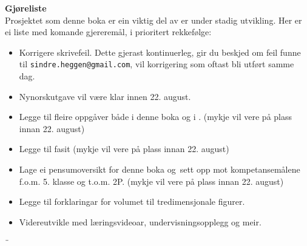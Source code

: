 \newpage
\textbf{Gjøreliste} \\
Prosjektet som denne boka er ein viktig del av er under stadig utvikling. Her er ei liste med komande gjereremål, i prioritert rekkefølge:
\begin{itemize}
	\item Korrigere skrivefeil. Dette gjerast kontinuerleg, gir du beskjed om feil funne til {\tt sindre.heggen@gmail.com}, vil korrigering som oftast bli utført samme dag.
	\item Nynorskutgave vil være klar innen 22. august.
	\item Legge til fleire oppgåver både i denne boka og i \mb. (mykje vil vere på plass innan 22. august)
	\item Legge til fasit (mykje vil vere på plass innan 22. august)
	\item Lage ei pensumoversikt for denne boka og \mb\,sett opp mot kompetansemålene f.o.m. 5. klasse og t.o.m. 2P. (mykje vil vere på plass innan 22. august)
	\item Legge til forklaringar for volumet til tredimensjonale figurer.
	\item Videreutvikle  med læringsvideoar, undervisningsopplegg og meir. 
\end{itemize}¨
\newpage

